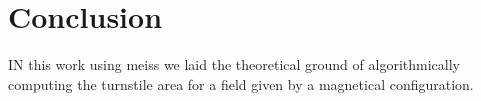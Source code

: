 \chapter{Conclusion}
IN this work using meiss we laid the theoretical ground of algorithmically computing the turnstile area for a field given by a magnetical configuration. 